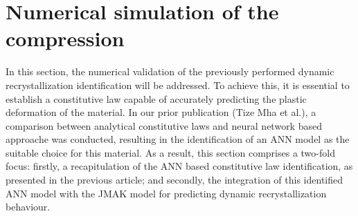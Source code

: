 \documentclass[metals,article,submit,pdftex,moreauthors]{Definitions/mdpi}
\makeatletter
\DeclareRobustCommand{\eal}{et al.\@\xspace}
\makeatother
\begin{document}
\section{Numerical simulation of the compression\label{sec:NumSim}}
In this section, the numerical validation of the previously performed dynamic recrystallization identification will be addressed. To achieve this, it is essential to establish a constitutive law capable of accurately predicting the plastic deformation of the material. In our prior publication (Tize Mha \eal \cite{TizeMha-2023}), a comparison between analytical constitutive laws and neural network based approache was conducted, resulting in the identification of an ANN model as the suitable choice for this material. As a result, this section comprises a two-fold focus: firstly, a recapitulation of the ANN based constitutive law identification, as presented in the previous article; and secondly, the integration of this identified ANN model with the JMAK model for predicting dynamic recrystallization behaviour.
\end{document}
